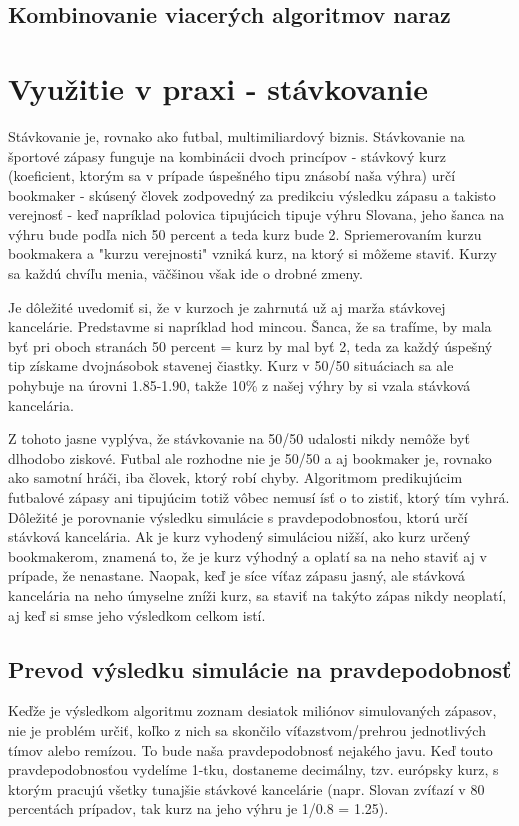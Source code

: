 \documentclass[10pt,twoside,slovak,a4paper]{article}
\begin{document}
\subsection{Kombinovanie viacerých algoritmov naraz}

\section{Využitie v praxi - stávkovanie}

Stávkovanie je, rovnako ako futbal, multimiliardový biznis. Stávkovanie na športové zápasy funguje na kombinácii dvoch princípov - stávkový kurz (koeficient, ktorým sa v prípade úspešného tipu znásobí naša výhra) určí bookmaker - skúsený človek zodpovedný za predikciu výsledku zápasu a takisto verejnosť - keď napríklad polovica tipujúcich tipuje výhru Slovana, jeho šanca na výhru bude podľa nich 50 percent a teda kurz bude 2. Spriemerovaním kurzu bookmakera a "kurzu verejnosti" vzniká kurz, na ktorý si môžeme staviť. Kurzy sa každú chvíľu menia, väčšinou však ide o drobné zmeny.

Je dôležité uvedomiť si, že v kurzoch je zahrnutá už aj marža stávkovej kancelárie. Predstavme si napríklad hod mincou. Šanca, že sa trafíme, by mala byť pri oboch stranách 50 percent = kurz by mal byť 2, teda za každý úspešný tip získame dvojnásobok stavenej čiastky. Kurz v 50/50 situáciach sa ale pohybuje na úrovni 1.85-1.90, takže 10\% z našej výhry by si vzala stávková kancelária.

Z tohoto jasne vyplýva, že stávkovanie na 50/50 udalosti nikdy nemôže byť dlhodobo ziskové. Futbal ale rozhodne nie je 50/50 a aj bookmaker je, rovnako ako samotní hráči, iba človek, ktorý robí chyby. Algoritmom predikujúcim futbalové zápasy ani tipujúcim totiž vôbec nemusí ísť o to zistiť, ktorý tím vyhrá. Dôležité je porovnanie výsledku simulácie s pravdepodobnosťou, ktorú určí stávková kancelária. Ak je kurz vyhodený simuláciou nižší, ako kurz určený bookmakerom, znamená to, že je kurz výhodný a oplatí sa na neho staviť aj v prípade, že nenastane. Naopak, keď je síce víťaz zápasu jasný, ale stávková kancelária na neho úmyselne zníži kurz, sa staviť na takýto zápas nikdy neoplatí, aj keď si smse jeho výsledkom celkom istí.

\subsection{Prevod výsledku simulácie na pravdepodobnosť}

Keďže je výsledkom algoritmu zoznam desiatok miliónov simulovaných zápasov, nie je problém určiť, koľko z nich sa skončilo víťazstvom/prehrou jednotlivých tímov alebo remízou. To bude naša pravdepodobnosť nejakého javu. Keď touto pravdepodobnosťou vydelíme 1-tku, dostaneme decimálny, tzv. európsky kurz, s ktorým pracujú všetky tunajšie stávkové kancelárie (napr. Slovan zvíťazí v 80 percentách prípadov, tak kurz na jeho výhru je 1/0.8 = 1.25).
\end{document}
